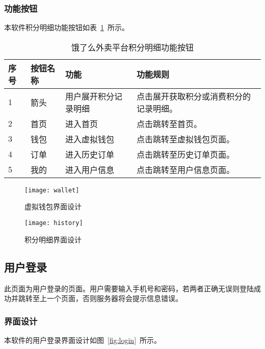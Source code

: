 \subsubsection{功能按钮}
本软件积分明细功能按钮如表~\ref{tab:table9}~所示。
\begin{table}[htbp]
    \caption{饿了么外卖平台积分明细功能按钮}\label{tab:table9}
    \vspace{0.5em}\wuhao
    \begin{tabularx}{\textwidth}{lllX}
    \toprule[1.5pt]
    序号 & 按钮名称 & 功能 & 功能规则 \\ 
    \midrule[1pt]
    1 & 箭头 & 用户展开积分记录明细 & 点击展开获取积分或消费积分的记录明细。 \\
    2 & 首页 & 进入首页 & 点击跳转至首页。 \\
    3 & 钱包 & 进入虚拟钱包 & 点击跳转至虚拟钱包页面。 \\
    4 & 订单 & 进入历史订单 & 点击跳转至历史订单页面。 \\
    5 & 我的 & 进入用户信息 & 点击跳转至用户信息页面。 \\
\bottomrule[1.5pt]
\end{tabularx}
\vspace{\baselineskip}
\end{table}
\begin{figure}[htbp]
    \centering
    \begin{minipage}{0.4\textwidth}
    \centering
    \texttt{[image: wallet]}
    \caption{虚拟钱包界面设计}\label{fig:wallet}
    \end{minipage}
    \begin{minipage}{0.4\textwidth}
    \centering
    \texttt{[image: history]}
    \caption{积分明细界面设计}\label{fig:history}
    \end{minipage}
    \vspace{\baselineskip}
\end{figure}

\subsection{用户登录}
此页面为用户登录的页面。用户需要输入手机号和密码，若两者正确无误则登陆成功并跳转至上一个页面，否则服务器将会提示信息错误。
\subsubsection{界面设计}
本软件的用户登录界面设计如图~\ref{fig:login}~所示。
